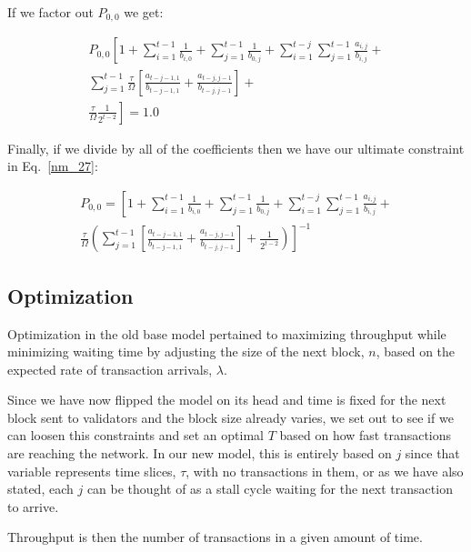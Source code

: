 \documentclass[conference]{IEEEtran}
\begin{document}
If we factor out $P_{0,0}$ we get:

\begin{multline}
  P_{0,0} \left[1 +  \sum_{i = 1}^{t-1}{\frac{1}{b_{i,0}}} + \sum_{j = 1}^{t-1}{\frac{1}{b_{0,j}}} + \right.
  \left.\sum_{i=1}^{t-j}{\sum_{j=1}^{t-1}{\frac{a_{i,j}}{b_{i,j}}}} + \right.\\
  \left.\sum_{j=1}^{t-1}{\frac{\tau}{\Omega}\left[\frac{a_{t-j-1,1}}{b_{t-j-1,1}} + \frac{a_{t-j,j-1}}{b_{t-j,j-1}}\right]} + \right.\\
  \left.\frac{\tau}{\Omega}\frac{1}{2^{t-2}}\right] = 1.0 \label{nm_26}
\end{multline}

Finally, if we divide by all of the coefficients then we have our ultimate constraint in Eq.~\ref{nm_27}:

\begin{multline}
  P_{0,0} = \left[1 +  \sum_{i = 1}^{t-1}{\frac{1}{b_{i,0}}} + \sum_{j = 1}^{t-1}{\frac{1}{b_{0,j}}} + \right.
  \left.\sum_{i=1}^{t-j}{\sum_{j=1}^{t-1}{\frac{a_{i,j}}{b_{i,j}}}} + \right.\\
  \left.\frac{\tau}{\Omega}\left(\sum_{j=1}^{t-1}{\left[\frac{a_{t-j-1,1}}{b_{t-j-1,1}} + \frac{a_{t-j,j-1}}{b_{t-j,j-1}}\right]} + \right.\right.
  \left.\left.\frac{1}{2^{t-2}}\right)\right]^{-1} \label{nm_26}
\end{multline}


\subsection{Optimization}\label{optimization}  

Optimization in the old base model pertained to maximizing throughput
while minimizing waiting time by adjusting the size of the next block, $n$,
based on the expected rate of transaction arrivals, $\lambda$. 

Since we have now flipped the model on its head and time is fixed for the next
block sent to validators and the block size already varies, we set out to see if
we can loosen this constraints and set an optimal $T$ based on how fast 
transactions are reaching the network. In our new model, this is entirely based
on $j$ since that variable represents time slices, $\tau$, with no transactions in them,
or as we have also stated, each $j$ can be thought of as a stall cycle waiting for
the next transaction to arrive.

Throughput is then the number of transactions in a given amount of time. 
\end{document}
